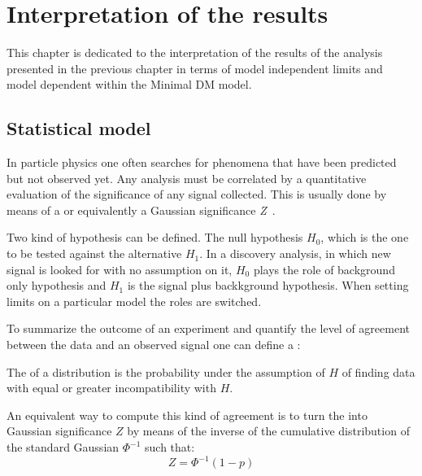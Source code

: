 \chapter{Interpretation of the results}

\lettrine{T}{}his chapter is dedicated to the interpretation of the results of the \mph analysis presented in the previous chapter in terms of model independent limits and model dependent within the Minimal DM model. 

\section{Statistical model}
In particle physics one often searches for phenomena that have been predicted but not observed yet. Any analysis must be correlated by a quantitative evaluation of the significance of any signal collected. This is usually done by means of a \p or equivalently a Gaussian significance \emph{Z}~\cite{Cowan}.

Two kind of hypothesis can be defined. The null hypothesis $H_{0}$, which is the one to be tested against the alternative $H_{1}$. In a discovery analysis, in which new signal is looked for with no assumption on it, $H_{0}$ plays the role of background only hypothesis and $H_{1}$ is the signal plus backkground hypothesis. When setting limits on a particular model the roles are switched.

To summarize the outcome of an experiment and quantify the level of agreement between the data and an observed signal one can define a \p:
\begin{definizione}
  The \p of a distribution is the probability under the assumption of $H$ of finding data with equal or greater incompatibility with $H$.
\end{definizione}

An equivalent way to compute this kind of agreement is to turn the \p into Gaussian significance $Z$ by means of the inverse of the cumulative distribution of the standard Gaussian $\Phi^{-1}$ such that:
\begin{equation}
  Z = \Phi^{-1}(1-p)
\end{equation}

